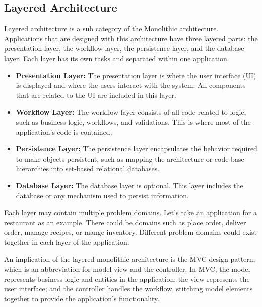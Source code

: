 \subsection[Layered Architecture]{Layered Architecture}

Layered architecture is a sub category of the Monolithic architecture. Applications that are designed with this architecture have three layered parts:
the presentation layer, the workflow layer, the persistence layer, and the database layer. Each layer has its own tasks and separated within one application.

\begin{itemize}
  \item \textbf{Presentation Layer:} The presentation layer is where the user interface (UI) is displayed and where the users interact with the system. All components that are related to the UI are included in this layer.
  
  \item \textbf{Workflow Layer:} The workflow layer consists of all code related to logic, such as business logic, workflows, and validations. This is where most of the application's code is contained.
  
  \item \textbf{Persistence Layer:} The persistence layer encapsulates the behavior required to make objects persistent, such as mapping the architecture or code-base hierarchies into set-based relational databases.
  
  \item \textbf{Database Layer:} The database layer is optional. This layer includes the database or any mechanism used to persist information.
\end{itemize}


Each layer may contain multiple problem domains. Let's take an application for a restaurant as an example. There could be domains such as place order,
deliver order, manage recipes, or mange inventory. Different problem domains could exist together in each layer of the application.

An implication of the layered monolithic architecture is the MVC design pattern, which is an abbreviation for model view and the controller.
In MVC, the model represents business logic and entities in the application; the view represents the user interface;
and the controller handles the workflow, stitching model elements together to provide the application’s functionality.

